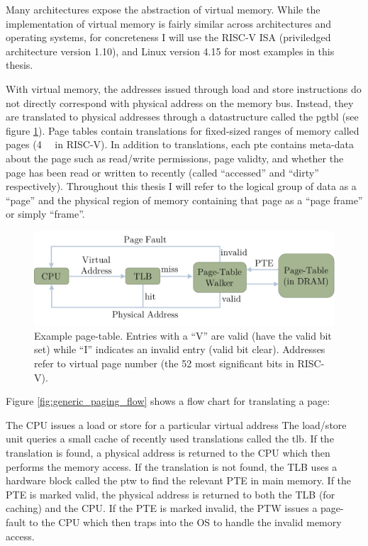 Many architectures expose the abstraction of virtual memory. While the
implementation of virtual memory is fairly similar across architectures and
operating systems, for concreteness I will use the RISC-V ISA (priviledged
architecture version 1.10\cite{riscv_priv110}), and Linux version
4.15\cite{linux} for most examples in this thesis.

With virtual memory, the addresses issued through load and store instructions
do not directly correspond with physical address on the memory bus. Instead,
they are translated to physical addresses through a datastructure called the
\gls{pgtbl} (see figure \ref{fig:generic_paging}).  Page tables contain
translations for fixed-sized ranges of memory called \glspl{page} (\SI{4}{\kibi\byte}
in RISC-V). In addition to translations, each \gls{pte} contains meta-data about the page such as read/write permissions, page
validty, and whether the page has been read or written to recently (called
``accessed'' and ``dirty'' respectively). Throughout this thesis I will refer to
the logical group of data as a ``page'' and the physical region of memory
containing that page as a ``page frame'' or simply ``frame''.  

\begin{figure}[h]
    \centering
    \includegraphics[width=0.5\columnwidth]{figs/generic_paging.pdf}
    \vspace{-5mm}
    \caption{Example page-table. Entries with a ``V'' are valid (have the valid
             bit set) while ``I'' indicates an invalid entry (valid bit clear).
           Addresses refer to virtual page number (the 52 most significant bits
         in RISC-V).}
    \label{fig:generic_paging}
\end{figure}

Figure \ref{fig:generic_paging_flow} shows a flow chart for translating a page:

\begin{outline}[enumerate]
  \1 The CPU issues a load or store for a particular virtual address
  \1 The load/store unit queries a small cache of recently used translations
  called the \gls{tlb}.
    \2 If the translation is found, a physical address is returned to the CPU
    which then performs the memory access.
  \1 If the translation is not found, the TLB uses a hardware block called the
  \gls{ptw} to find the relevant PTE in main memory.
    \2 If the PTE is marked valid, the physical address is returned to both the
    TLB (for caching) and the CPU.
  \1 If the PTE is marked invalid, the PTW issues a page-fault to the CPU which
  then traps into the OS to handle the invalid memory access.
\end{outline}

